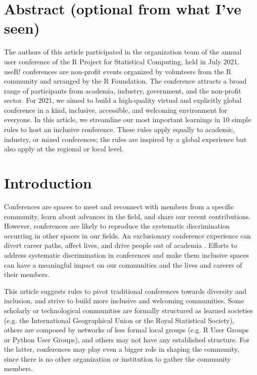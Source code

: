 \documentclass[10pt,letterpaper]{article}
\begin{document}
\section*{Abstract (optional from what I've seen)}

The authors of this article participated in the organization team of the annual user conference of the R Project for Statistical Computing, held in July 2021. useR! conferences are non-profit events organized by volunteers from the R community and arranged by the R Foundation. The conference attracts a broad range of participants from academia, industry, government, and the non-profit sector. For 2021, we aimed to build a high-quality virtual and explicitly global conference in a kind, inclusive, accessible, and welcoming environment for everyone. 
In this article, we streamline our most important learnings in 10 simple rules to host an inclusive conference. These rules apply equally to academic, industry, or mixed conferences; the rules are inspired by a global experience but also apply at the regional or local level.





\linenumbers

\section*{Introduction}

Conferences are spaces to meet and reconnect with members from a specific community, learn about advances in the field, and share our recent contributions. 
However, conferences are likely to reproduce the systematic discrimination occurring in other spaces in our fields.
An exclusionary conference experience can divert career paths, affect lives, and drive people out of academia \cite{biggsAcademicConferenceChilly2018}.
Efforts to address systematic discrimination in conferences and make them inclusive spaces can have a meaningful impact on our communities and the lives and careers of their members. 

This article suggests rules to pivot traditional conferences towards diversity and inclusion, and strive to build more inclusive and welcoming communities. 
Some scholarly or technological communities are formally structured as learned societies (e.g. the International Geographical Union or the Royal Statistical Society), others are composed by networks of less formal local groups (e.g. R User Groups or Python User Groups), and others may not have any established structure. 
For the latter, conferences may play even a bigger role in shaping the community, since there is no other organization or institution to gather the community members. 
\end{document}
